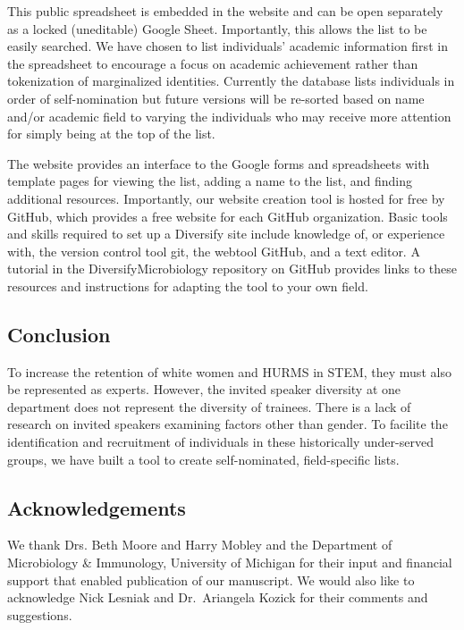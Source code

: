 \documentclass[10pt,]{article}
\begin{document}
This public spreadsheet is embedded in the website and can be open
separately as a locked (uneditable) Google Sheet. Importantly, this
allows the list to be easily searched. We have chosen to list
individuals' academic information first in the spreadsheet to encourage
a focus on academic achievement rather than tokenization of marginalized
identities. Currently the database lists individuals in order of
self-nomination but future versions will be re-sorted based on name
and/or academic field to varying the individuals who may receive more
attention for simply being at the top of the list.

The website provides an interface to the Google forms and spreadsheets
with template pages for viewing the list, adding a name to the list, and
finding additional resources. Importantly, our website creation tool is
hosted for free by GitHub, which provides a free website for each GitHub
organization. Basic tools and skills required to set up a Diversify site
include knowledge of, or experience with, the version control tool git,
the webtool GitHub, and a text editor. A tutorial in the
DiversifyMicrobiology repository on GitHub provides links to these
resources and instructions for adapting the tool to your own field.

\subsection{Conclusion}\label{conclusion}

To increase the retention of white women and HURMS in STEM, they must
also be represented as experts. However, the invited speaker diversity
at one department does not represent the diversity of trainees. There is
a lack of research on invited speakers examining factors other than
gender. To facilite the identification and recruitment of individuals in
these historically under-served groups, we have built a tool to create
self-nominated, field-specific lists.

\subsection{Acknowledgements}\label{acknowledgements}

We thank Drs. Beth Moore and Harry Mobley and the Department of
Microbiology \& Immunology, University of Michigan for their input and
financial support that enabled publication of our manuscript. We would
also like to acknowledge Nick Lesniak and Dr.~Ariangela Kozick for their
comments and suggestions.
\end{document}
